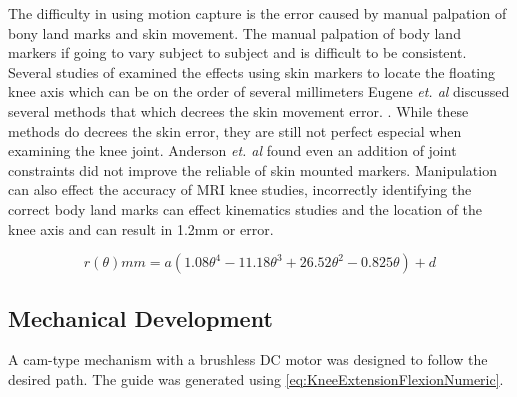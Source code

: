 The difficulty in using motion capture is the error caused by manual palpation of bony land marks and skin movement. The manual palpation of body land markers if going to vary subject to subject and is difficult to  be consistent. Several studies of examined the effects using skin markers to locate the floating knee axis which can be on the order of several millimeters Eugene \textit{et. al} discussed several methods that which decrees the skin movement error. \cite{alexander2001correcting} \cite{cappozzo1996position}. While these methods do decrees the skin error, they are still not perfect especial when examining the knee joint.  Anderson \textit{et. al} found even an addition of joint constraints did not improve the reliable of skin mounted markers. Manipulation can also effect the accuracy of MRI knee studies, incorrectly identifying the correct body land marks can effect kinematics studies and the location of the knee axis \cite{lerner2003use} and can result in 1.2mm or error. 


\begin{equation}
    r(\theta) mm = a(1.08\theta^4 - 11.18\theta^3 + 26.52\theta^2 - 0.825\theta) + d
    \label{eq:KneeExtensionFlexionNumeric}
\end{equation}





\subsection{Mechanical Development}

A cam-type mechanism with a brushless DC motor was designed to follow the desired path. The guide was generated using \autoref{eq:KneeExtensionFlexionNumeric}. 


